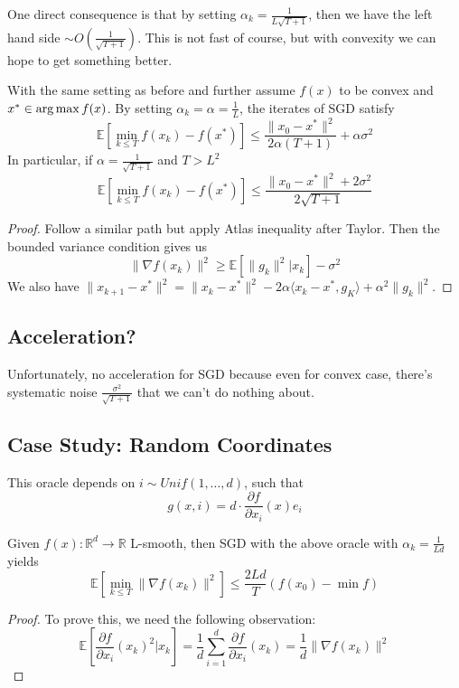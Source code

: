 One direct consequence is that by setting $\alpha_k = \frac{1}{L\sqrt{T+1}}$, then we have the left hand side $\sim O(\frac{1}{\sqrt{T+1}})$. This is not fast of course, but with convexity we can hope to get something better. 
\begin{theorem}
    With the same setting as before and further assume $f(x)$ to be convex and $x^* \in \operatorname*{arg\,max} f(x)$. By setting $\alpha_k = \alpha = \frac{1}{L}$, the iterates of SGD satisfy
    \begin{equation*}
        \mathbb{E}[\min_{k \leq T} f(x_k) - f(x^*)] \leq \frac{\|x_0 - x^*\|^2}{2\alpha(T+1)} + \alpha\sigma^2
    \end{equation*}
    In particular, if $\alpha = \frac{1}{\sqrt{T+1}}$ and $T > L^2$
    \begin{equation*}
        \mathbb{E}[\min_{k \leq T}f(x_k) - f(x^*)] \leq \frac{\|x_0 - x^*\|^2 + 2\sigma^2}{2\sqrt{T+1}}
    \end{equation*}
\end{theorem}
\begin{proof}
    Follow a similar path but apply Atlas inequality after Taylor. Then the bounded variance condition gives us 
    \begin{equation*}
        \|\nabla f(x_k)\|^2 \geq \mathbb{E}[\|g_k\|^2 | x_k] - \sigma^2
    \end{equation*}
    We also have $\|x_{k+1} - x^*\|^2 = \|x_k - x^*\|^2 - 2\alpha\langle x_k - x^*, g_K \rangle + \alpha^2\|g_k\|^2$. 
\end{proof}

\subsection*{Acceleration?}
Unfortunately, no acceleration for SGD because even for convex case, there's systematic noise $\frac{\sigma^2}{\sqrt{T+1}}$ that we can't do nothing about.

\subsection*{Case Study: Random Coordinates}
This oracle depends on $i \sim Unif(1, \ldots, d)$, such that
\begin{equation*}
    g(x, i) = d \cdot \frac{\partial f}{\partial x_i}(x)e_i
\end{equation*}

\begin{theorem}
    Given $f(x): \mathbb{R}^d \rightarrow \mathbb{R}$ L-smooth, then SGD with the above oracle with $\alpha_k = \frac{1}{Ld}$ yields
    \begin{equation*}
        \mathbb{E}[\min_{k\leq T} \|\nabla f(x_k)\|^2] \leq \frac{2Ld}{T}(f(x_0) - \min f)
    \end{equation*}
\end{theorem}
\begin{proof}
    To prove this, we need the following observation:
    \begin{equation*}
        \mathbb{E}[\frac{\partial f}{\partial x_i}(x_k)^2 | x_k] = \frac{1}{d}\sum_{i=1}^{d}\frac{\partial f}{\partial x_i}(x_k) = \frac{1}{d}\|\nabla f(x_k)\|^2
    \end{equation*}
\end{proof}